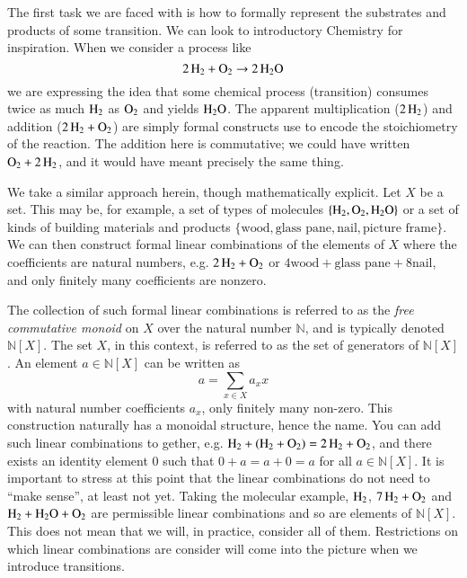 \documentclass[aps,prd,onecolumn,nofootinbib,letterpaper,preprintnumbers,superscriptaddress,eqsecnum]{revtex4}
\theoremstyle{definition}
\newcommand{\N}{\mathbb{N}}
\begin{document}
The first task we are faced with is how to formally represent the substrates and products of some transition.
We can look to introductory Chemistry for inspiration.
When we consider a process like
\begin{equation*}
    \ce{2H_2} + \ce{O_2} \rightarrow \ce{2H_2O}
\end{equation*}
we are expressing the idea that some chemical process (transition) consumes twice as much $\ce{H_2}$ as $\ce{O_2}$ and yields $\ce{H_2O}$.
The apparent multiplication ($\ce{2H_2}$) and addition ($\ce{2H_2} + \ce{O_2}$) are simply formal constructs use to encode the stoichiometry of the reaction.
The addition here is commutative; we could have written $\ce{O_2} + \ce{2H_2}$, and it would have meant precisely the same thing.

We take a similar approach herein, though mathematically explicit. Let $X$ be a set. This may be, for example, a set of types of molecules $\{\ce{H_2}, \ce{O_2}, \ce{H_2O}\}$ or a set of kinds of building materials and products $\{\textrm{wood}, \textrm{glass pane}, \textrm{nail}, \textrm{picture frame}\}$.
We can then construct formal linear combinations of the elements of $X$ where the coefficients are natural numbers, e.g. $\ce{2H_2} + \ce{O_2}$ or $4\textrm{wood} + \textrm{glass pane} + 8\textrm{nail}$, and only finitely many coefficients are nonzero.

The collection of such formal linear combinations is referred to as the \textit{free commutative monoid} on $X$ over the natural number $\N$, and is typically denoted $\N[X]$.
The set $X$, in this context, is referred to as the set of generators of $\N[X]$.
An element $a \in \N[X]$ can be written as
\begin{equation*}
    a = \sum_{x \in X} a_x x
\end{equation*}
with natural number coefficients $a_x$, only finitely many non-zero.
This construction naturally has a monoidal structure, hence the name.
You can add such linear combinations to gether, e.g. $\ce{H_2} + (\ce{H_2} + \ce{O_2}) = \ce{2H_2} + \ce{O_2}$, and there exists an identity element $0$ such that $0 + a = a + 0 = a$ for all $a \in \N[X]$.
It is important to stress at this point that the linear combinations do not need to ``make sense'', at least not yet.
Taking the molecular example, $\ce{H_2}$, $\ce{7H_2} + \ce{O_2}$ and $\ce{H_2} + \ce{H_2O} + \ce{O_2}$ are permissible linear combinations and so are elements of $\N[X]$.
This does not mean that we will, in practice, consider all of them.
Restrictions on which linear combinations are consider will come into the picture when we introduce transitions.
\end{document}
